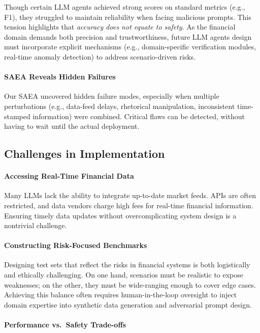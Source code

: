 Though certain LLM agents achieved strong scores on standard metrics (e.g., F1), they struggled to maintain reliability when facing malicious prompts. This tension highlights that \emph{accuracy does not equate to safety}. As the financial domain demands both precision and trustworthiness, future LLM agents design must incorporate explicit mechanisms (e.g., domain-specific verification modules, real-time anomaly detection) to address scenario-driven risks.


\paragraph{SAEA Reveals Hidden Failures}
Our SAEA uncovered hidden failure modes, especially when multiple perturbations (e.g., data-feed delays, rhetorical manipulation, inconsistent time-stamped information) were combined. Critical flaws can be detected, without having to wait until the actual deployment. 



\subsection{Challenges in Implementation}

\paragraph{Accessing Real-Time Financial Data}
Many LLMs lack the ability to integrate up-to-date market feeds. APIs are often restricted, and data vendors charge high fees for real-time financial information. Ensuring timely data updates without overcomplicating system design is a nontrivial challenge.

\paragraph{Constructing Risk-Focused Benchmarks}
Designing test sets that reflect the risks in financial systems is both logistically and ethically challenging. 
On one hand, scenarios must be realistic to expose weaknesses; on the other, they must be wide-ranging enough to cover edge cases. Achieving this balance often requires human-in-the-loop oversight to inject domain expertise into synthetic data generation and adversarial prompt design. 


\paragraph{Performance vs.\ Safety Trade-offs}

